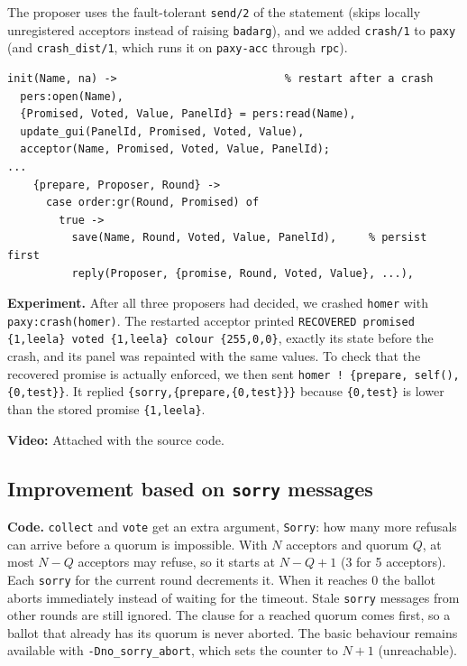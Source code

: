 \documentclass[a4paper, 10pt]{article}
\begin{document}
The proposer uses the fault-tolerant \texttt{send/2} of the statement (skips locally unregistered acceptors instead of raising \texttt{badarg}), and we added \texttt{crash/1} to \texttt{paxy} (and \texttt{crash\_dist/1}, which runs it on \texttt{paxy-acc} through \texttt{rpc}).

\begin{lstlisting}
init(Name, na) ->                          % restart after a crash
  pers:open(Name),
  {Promised, Voted, Value, PanelId} = pers:read(Name),
  update_gui(PanelId, Promised, Voted, Value),
  acceptor(Name, Promised, Voted, Value, PanelId);
...
    {prepare, Proposer, Round} ->
      case order:gr(Round, Promised) of
        true ->
          save(Name, Round, Voted, Value, PanelId),     % persist first
          reply(Proposer, {promise, Round, Voted, Value}, ...),
\end{lstlisting}

\textbf{Experiment.} After all three proposers had decided, we crashed \texttt{homer} with \texttt{paxy:crash(homer)}. The restarted acceptor printed \texttt{RECOVERED promised \{1,leela\} voted \{1,leela\} colour \{255,0,0\}}, exactly its state before the crash, and its panel was repainted with the same values. To check that the recovered promise is actually enforced, we then sent \texttt{homer ! \{prepare, self(), \{0,test\}\}}. It replied \texttt{\{sorry,\{prepare,\{0,test\}\}\}} because \texttt{\{0,test\}} is lower than the stored promise \texttt{\{1,leela\}}.

\noindent\textbf{Video:} Attached with the source code.

\subsection{Improvement based on \texttt{sorry} messages}
\label{sec:improvement}

\textbf{Code.} \texttt{collect} and \texttt{vote} get an extra argument, \texttt{Sorry}: how many more refusals can arrive before a quorum is impossible. With $N$ acceptors and quorum $Q$, at most $N-Q$ acceptors may refuse, so it starts at $N-Q+1$ (3 for 5 acceptors). Each \texttt{sorry} for the current round decrements it. When it reaches 0 the ballot aborts immediately instead of waiting for the timeout. Stale \texttt{sorry} messages from other rounds are still ignored. The clause for a reached quorum comes first, so a ballot that already has its quorum is never aborted. The basic behaviour remains available with \texttt{-Dno\_sorry\_abort}, which sets the counter to $N+1$ (unreachable).
\end{document}
